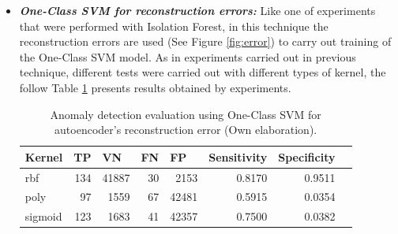 \begin{itemize}
\item \textbf{\textit{One-Class SVM for reconstruction errors: }}Like one of experiments that were performed with Isolation Forest, in this technique the reconstruction errors are used (See Figure \ref{fig:error}) to carry out training of the One-Class SVM model. As in experiments carried out in previous technique, different tests were carried out with different types of kernel, the follow Table \ref{table:evaluacion_SVM_error} presents results obtained by experiments.

\begin{table}[H]
\centering
\begin{center}
\begin{tabular}{|l|r|r|r|r|r|r|r|}
\hline
\textbf{Kernel} & \multicolumn{1}{l|}{\textbf{TP}} & \multicolumn{1}{l|}{\textbf{VN}}& \multicolumn{1}{l|}{\textbf{FN}}& \multicolumn{1}{l|}{\textbf{FP}} & \multicolumn{1}{l|}{\textbf{Sensitivity}} & \multicolumn{1}{l|}{\textbf{Specificity}} \\ \hline
rbf & \cellcolor[HTML]{AADD99} 134 & \cellcolor[HTML]{AADD99} 41887 & \cellcolor[HTML]{FFCE93} 30 & \cellcolor[HTML]{FFCE93} 2153 & 0.8170 & 0.9511 \\ \hline
poly & \cellcolor[HTML]{AADD99} 97 & \cellcolor[HTML]{AADD99} 1559 & \cellcolor[HTML]{FFCE93} 67 & \cellcolor[HTML]{FFCE93} 42481 & 0.5915 & 0.0354 \\ \hline
sigmoid & \cellcolor[HTML]{AADD99} 123 & \cellcolor[HTML]{AADD99} 1683 & \cellcolor[HTML]{FFCE93} 41 & \cellcolor[HTML]{FFCE93} 42357 & 0.7500 & 0.0382 \\ \hline
\end{tabular}
\end{center}
\caption{Anomaly detection evaluation using One-Class SVM for autoencoder's reconstruction error (Own elaboration).}

\label{table:evaluacion_SVM_error}
\end{table}


\end{itemize}
